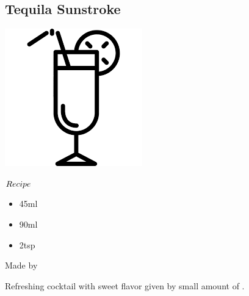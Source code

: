 \subsection{Tequila Sunstroke}
\vspace{-7.4mm}
\hspace{51mm}
\includegraphics[scale=.07]{cocktail_glass_tall.png}
\vspace{2.5mm}
\begin{itembox}[l]{\boldmath $Recipe$}
\begin{itemize}
\setlength{\parskip}{0cm}
\setlength{\itemsep}{0cm}
\item \teq 45ml
\item \gj 90ml
\item \cointreau 2tsp
\end{itemize}
\vspace{-4mm}
Made by \build
\end{itembox}
Refreshing cocktail with sweet flavor given by small amount of \wc
\hspace{-1mm}.
